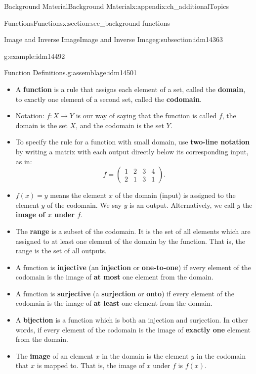 \documentclass[oneside,10pt,]{book}
\newcommand{\terminology}[1]{\textbf{#1}}
\numberwithin{equation}{chapter}
\newcommand{\amp}{&}
\begin{document}
\begin{appendixptx}{Background Material}{}{Background Material}{}{}{x:appendix:ch_additionalTopics}
\begin{sectionptx}{Functions}{}{Functions}{}{}{x:section:sec_background-functions}
\begin{subsectionptx}{Image and Inverse Image}{}{Image and Inverse Image}{}{}{g:subsection:idm14363}
\begin{example}{}{g:example:idm14492}
\begin{equation*}
\end{equation*}
%
\end{example}
\begin{assemblage}{Function Definitions.}{g:assemblage:idm14501}%
%
\begin{itemize}[label=\textbullet]
\item{}A \terminology{function} is a rule that assigns each element of a set, called the \terminology{domain}, to exactly one element of a second set, called the \terminology{codomain}.%
\item{}Notation: \(f:X \to Y\) is our way of saying that the function is called \(f\), the domain is the set \(X\), and the codomain is the set \(Y\).%
\item{}To specify the rule for a function with small domain, use \terminology{two-line notation} by writing a matrix with each output directly below its corresponding input, as in:%
\begin{equation*}
f = \begin{pmatrix}1 \amp 2 \amp 3 \amp 4 \\ 2 \amp 1 \amp 3 \amp 1 \end{pmatrix}.
\end{equation*}
%
\item{}\(f(x) = y\) means the element \(x\) of the domain (input) is assigned to the element \(y\) of the codomain. We say \(y\) is an output. Alternatively, we call \(y\) the \terminology{image of \(x\) under \(f\)}.%
\item{}The \terminology{range} is a subset of the codomain. It is the set of all elements which are assigned to at least one element of the domain by the function. That is, the range is the set of all outputs.%
\item{}A function is \terminology{injective} (an \terminology{injection} or \terminology{one-to-one}) if every element of the codomain is the image of \terminology{at most} one element from the domain.%
\item{}A function is \terminology{surjective} (a \terminology{surjection} or \terminology{onto}) if every element of the codomain is the image of \terminology{at least} one element from the domain.%
\item{}A \terminology{bijection} is a function which is both an injection and surjection. In other words, if every element of the codomain is the image of \terminology{exactly one} element from the domain.%
\item{}The \terminology{image} of an element \(x\) in the domain is the element \(y\) in the codomain that \(x\) is mapped to.  That is, the image of \(x\) under \(f\) is  \(f(x)\).%

\end{itemize}
\end{assemblage}
\end{subsectionptx}
\end{sectionptx}
\end{appendixptx}
\end{document}
